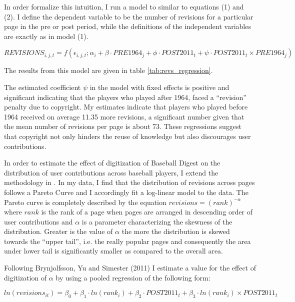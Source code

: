 \documentclass[12pt]{article}
\begin{document}
In order formalize this intuition, I run a model to similar to equations (1) and (2). I define the dependent variable to be the number of revisions for a particular page in the pre or post period, while the definitions of the independent variables are exactly as in model (1). 

\begin{equation*}
REVISIONS_{i,j,t} = f(\epsilon_{i,j,t}; \alpha_i + \beta \cdot PRE1964_{j}+ \phi \cdot POST2011_{t} + \psi \cdot POST2011_{t} \times PRE1964_{j})
\end{equation*}

The results from this model are given in table \ref{tab:revs_regression}. 

\label{tab:revs_regression}


The estimated coefficient $\psi$ in the model with fixed effects is positive and significant indicating that the players who played after 1964, faced a ``revision'' penalty due to copyright. My estimates indicate that players who played before 1964 received on average 11.35 more revisions, a significant number given that the mean number of revisions per page is about 73. These regressions suggest that copyright not only hinders the reuse of knowledge but also discourages user contributions. 

In order to estimate the effect of digitization of Baseball Digest on the distribution of user contributions across baseball players, I extend the methodology in \cite{longtail}. In my data, I find that the distribution of revisions across pages follows a Pareto Curve and I accordingly fit a log-linear model to the data. The Pareto curve is completely described by the equation $revisions = (rank)^{-\alpha}$ where $rank$ is the rank of a page when pages are arranged in descending order of user contributions and $\alpha$ is a parameter characterizing the skewness of the distribution. Greater is the value of $\alpha$ the more the distribution is skewed towards the ``upper tail'', i.e. the really popular pages and consequently the area under lower tail is significantly smaller as compared to the overall area. 

Following Brynjolfsson, Yu and Simester (2011) I estimate a value for the effect of digitization of $\alpha$ by using a pooled regression of the following form:

$ln(revisions_{it}) = \beta_0 + \beta_1 \cdot ln(rank_i) + \beta_2 \cdot POST2011_t + \beta_3 \cdot ln(rank_i) \times POST2011_t $
\end{document}
